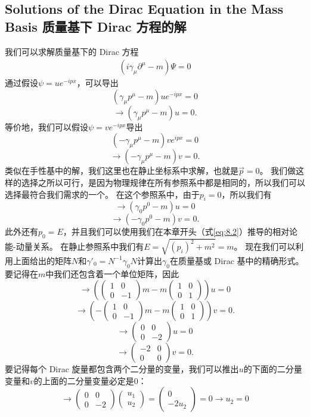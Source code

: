 \subsection[质量基下 Dirac 方程的解]{Solutions of the Dirac Equation in the Mass Basis 质量基下 Dirac 方程的解}\label{sec8.10.1}

我们可以求解质量基下的 Dirac 方程
\begin{align}
  (i\gamma_\mu\partial^\mu-m)\Psi=0
\end{align}
通过假设$\psi=ue^{-ipx}$，可以导出
\[(\gamma_\mu p^\mu-m)ue^{-ipx}=0\]
\[\rightarrow(\gamma_\mu p^\mu-m)u=0.\]
等价地，我们可以假设$\psi=ve^{-ipx}$导出
\[(-\gamma_\mu p^\mu-m)ve^{ipx}=0\]
\[\rightarrow(-\gamma_\mu p^\mu-m)v=0.\]
类似在手性基中的解，我们这里也在静止坐标系中求解，也就是$\vec{p}=0$。
我们做这样的选择之所以可行，是因为物理规律在所有参照系中都是相同的，所以我们可以选择最符合我们需求的一个。
在这个参照系中，由于$p_i=0$，所以我们有
\[\rightarrow(\gamma_0p^0-m)u=0\]
\[\rightarrow(-\gamma_0p^0-m)v=0.\]
此外还有$p_0=E$，并且我们可以使用我们在本章开头（式\ref{eq:8.2}）推导的相对论能-动量关系。
在静止参照系中我们有$E=\sqrt{(p_i)^2+m^2}=m$。
现在我们可以利用上面给出的矩阵$N$和$\gamma'_0=N^{-1}\gamma_0N$计算出$\gamma_0$在质量基或 Dirac 基中的精确形式。
要记得在$m$中我们还包含着一个单位矩阵，因此
\[\rightarrow\left(\begin{pmatrix}1&0\\0&-1\end{pmatrix}m-m\begin{pmatrix}1&0\\0&1\end{pmatrix}\right)u=0\]
\[\rightarrow\left(-\begin{pmatrix}1&0\\0&-1\end{pmatrix}m-m\begin{pmatrix}1&0\\0&1\end{pmatrix}\right)v=0.\]
\[\rightarrow\begin{pmatrix}0&0\\0&-2\end{pmatrix}u=0\]
\[\rightarrow\begin{pmatrix}-2&0\\0&0\end{pmatrix}v=0.\]
要记得每个 Dirac 旋量都包含两个二分量的变量，我们可以推出$u$的下面的二分量变量和$v$的上面的二分量变量必定是0：
\[\rightarrow\begin{pmatrix}0&0\\0&-2\end{pmatrix}\begin{pmatrix}u_1\\u_2\end{pmatrix}=\begin{pmatrix}0\\-2u_2\end{pmatrix}=0\rightarrow u_2=0\]
